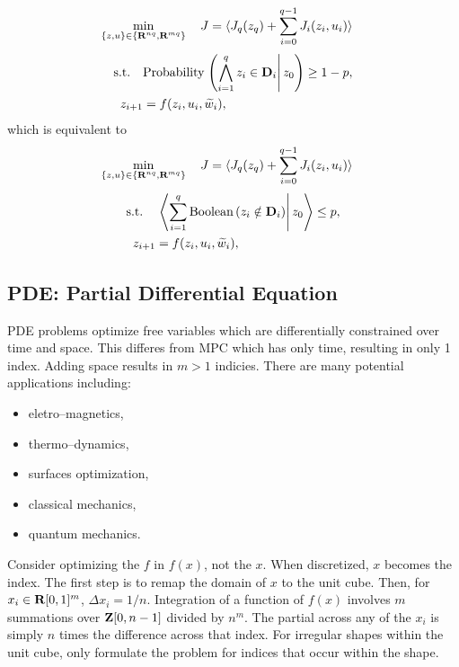 \documentclass{article}
\begin{document}
    \begin{align*}
        \min_{\{z,u\}\in\{\textbf{R}^{nq},\textbf{R}^{mq}\}}\quad J&=\langle J _q(z_q)+\sum_{i=0}^{q-1}  J _i(z_i,u_i)\rangle
    \end{align*}
    \begin{align*}
        \text{s.t.}\quad &\text{Probability}\left.\left(\bigwedge_{i=1}^{q} z_i\in\textbf{D}_i\right|z_0\right)\geq 1- p,\\
        z_{i+1}&=f(z_i,u_i,\widetilde{w}_i),
    \end{align*}
    which is equivalent to
    \begin{align*}
        \min_{\{z,u\}\in\{\textbf{R}^{nq},\textbf{R}^{mq}\}}\quad J&=\langle J _q(z_q)+\sum_{i=0}^{q-1}  J _i(z_i,u_i)\rangle
    \end{align*}
    \begin{align*}
        \text{s.t.}\quad &\left.\left\langle\sum_{i=1}^{q} \text{Boolean}\left(z_i\notin\textbf{D}_i\right)\right | z_0\right\rangle\leq p,\\
        z_{i+1}&=f(z_i,u_i,\widetilde{w}_i),
    \end{align*}

\subsection{PDE: Partial Differential Equation}

    PDE problems optimize free variables which are differentially constrained over time and space.
    This differes from MPC which has only time, resulting in only 1 index.  
    Adding space results in $m>1$ indicies.
    There are many potential applications including:
    \begin{itemize}
        \item eletro--magnetics,
        \item thermo--dynamics,
        \item surfaces optimization,
        \item classical mechanics,
        \item quantum mechanics. 
    \end{itemize}
    
    Consider optimizing the $f$ in $f(x)$, not the $x$.  When discretized, $x$ becomes the index.
    The first step is to remap the domain of $x$ to the unit cube.  Then, for $x_i\in\textbf{R}[0,1]^m$, $\Delta x_i=1/n$.
    Integration of a function of $f(x)$ involves $m$ summations over $\textbf{Z}[0,n-1]$ divided by $n^m$.
    The partial across any of the $x_i$ is simply $n$ times the difference across that index.
    For irregular shapes within the unit cube, only formulate the problem for indices that occur within the shape.
\end{document}
